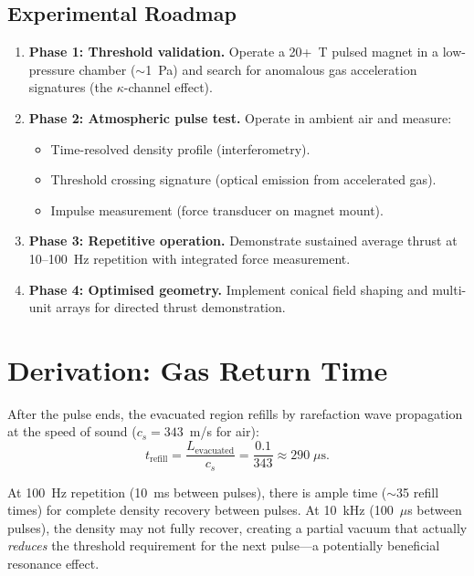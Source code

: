 \documentclass[amsmath,amssymb,aps,prd,superscriptaddress,nofootinbib]{revtex4-2}
\begin{document}
\subsection{Experimental Roadmap}

\begin{enumerate}
\item \textbf{Phase 1: Threshold validation.} Operate a 20+~T pulsed
  magnet in a low-pressure chamber ($\sim$1~Pa) and search for anomalous
  gas acceleration signatures (the $\kappa$-channel effect).

\item \textbf{Phase 2: Atmospheric pulse test.} Operate in ambient air
  and measure:
  \begin{itemize}
  \item Time-resolved density profile (interferometry).
  \item Threshold crossing signature (optical emission from accelerated gas).
  \item Impulse measurement (force transducer on magnet mount).
  \end{itemize}

\item \textbf{Phase 3: Repetitive operation.} Demonstrate sustained
  average thrust at 10--100~Hz repetition with integrated force
  measurement.

\item \textbf{Phase 4: Optimised geometry.} Implement conical field
  shaping and multi-unit arrays for directed thrust demonstration.
\end{enumerate}

\appendix

\section{Derivation: Gas Return Time}\label{app:return}

After the pulse ends, the evacuated region refills by rarefaction wave
propagation at the speed of sound ($c_s = 343$~m/s for air):
\begin{equation}
t_\text{refill} = \frac{L_\text{evacuated}}{c_s}
= \frac{0.1}{343} \approx 290 \; \mu\text{s}.
\end{equation}

At 100~Hz repetition (10~ms between pulses), there is ample time
($\sim$35 refill times) for complete density recovery between pulses.
At 10~kHz (100~$\mu$s between pulses), the density may not fully
recover, creating a partial vacuum that actually \emph{reduces} the
threshold requirement for the next pulse---a potentially beneficial
resonance effect.
\end{document}
